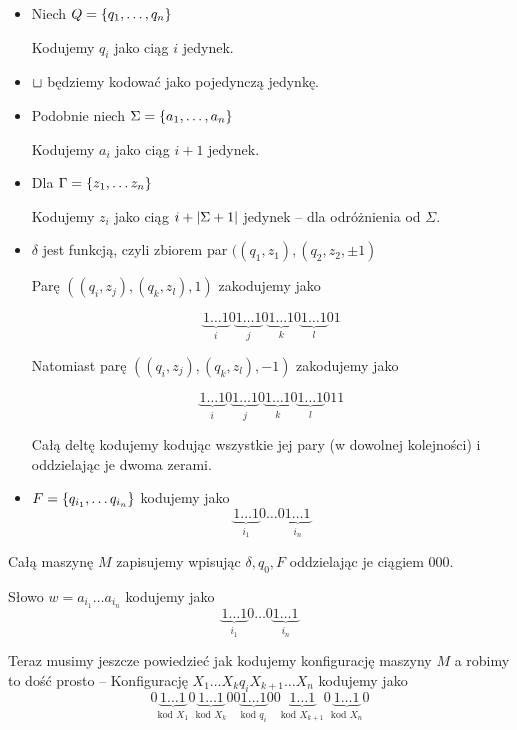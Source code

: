 \begin{itemize}
	\item Niech \( Q = \set{q_1, \dots, q_n} \)

	      Kodujemy \( q_i \) jako ciąg \( i \) jedynek.

	\item \( \sqcup \) będziemy kodować jako pojedynczą jedynkę.


	\item Podobnie niech \( \Sigma = \set{a_1, \dots, a_n} \)

	      Kodujemy \( a_i \) jako ciąg \( i + 1 \) jedynek.

	\item Dla \( \Gamma = \set{z_1, \dots z_n} \)

	      Kodujemy \( z_i \) jako ciąg \( i + \card{\Sigma + 1} \) jedynek -- dla odróżnienia od \( \Sigma \).

	\item \( \delta \) jest funkcją, czyli zbiorem par \( ((q_1, z_1), (q_2, z_2, \pm 1) \)

	      Parę \( ((q_i, z_j), (q_k, z_l), 1) \) zakodujemy jako

	      \[
		      \underbrace{1 \dots 1}_i
		      0
		      \underbrace{1 \dots 1}_j
		      0
		      \underbrace{1 \dots 1}_k
		      0
		      \underbrace{1 \dots 1}_l
		      0
		      1
	      \]

	      Natomiast parę \( ((q_i, z_j), (q_k, z_l), -1) \) zakodujemy jako

	      \[
		      \underbrace{1 \dots 1}_i
		      0
		      \underbrace{1 \dots 1}_j
		      0
		      \underbrace{1 \dots 1}_k
		      0
		      \underbrace{1 \dots 1}_l
		      0
		      11
	      \]

	      Całą deltę kodujemy kodując wszystkie jej pary (w dowolnej kolejności) i oddzielając je dwoma zerami.

	\item \( F = \set{q_{i_1}, \dots q_{i_n}} \) kodujemy jako
	      \[
		      \underbrace{1 \dots 1}_{i_1} 0 \dots 0 \underbrace{1 \dots 1}_{i_n}
	      \]
\end{itemize}

Całą maszynę \( M \) zapisujemy wpisując \( \delta, q_0, F \) oddzielając je ciągiem \( 000 \).

Słowo \( w = a_{i_1} \dots a_{i_n} \) kodujemy jako
\[
	\underbrace{1 \dots 1}_{i_1} 0 \dots 0 \underbrace{1 \dots 1}_{i_n}
\]

Teraz musimy jeszcze powiedzieć jak kodujemy konfigurację maszyny \( M \) a robimy to dość prosto --
Konfigurację \( X_1 \dots X_k q_i X_{k+1} \dots X_n \) kodujemy jako
\[
	0\underbrace{1 \dots 1}_{\text{kod } X_1} 0 \underbrace{1 \dots 1}_{\text{kod } X_k} 00 \underbrace{1 \dots 1}_{\text{kod } q_i} 00 \underbrace{1 \dots 1}_{\text{kod } X_{k + 1}} 0 \underbrace{1 \dots 1}_{\text{kod } X_n} 0
\]

